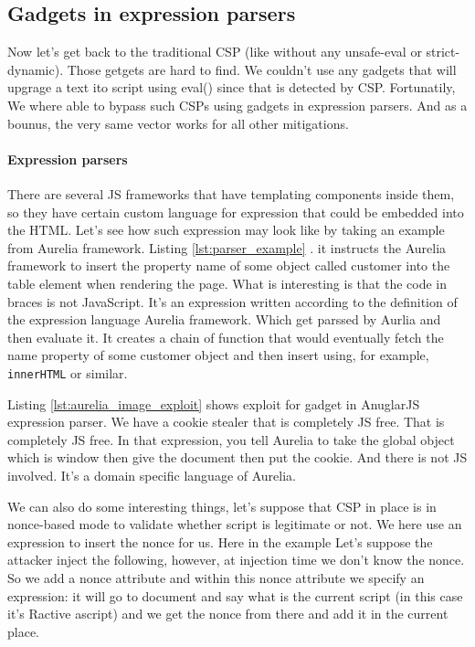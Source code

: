 \subsection{Gadgets in expression parsers}
Now let’s get back to the traditional CSP (like without any unsafe-eval or strict-dynamic). Those getgets are hard to find. We couldn’t use any gadgets that will upgrage a text ito script using eval() since that is detected by CSP. Fortunatily, We where able to bypass such CSPs using gadgets in expression parsers. And as a bounus, the very same vector works for all other mitigations. 

\paragraph{Expression parsers}
There are several JS frameworks that have templating components inside them, so they have certain custom language for expression that could be embedded into the HTML. Let’s see how such expression may look like by taking an example from Aurelia framework. Listing \ref{lst:parser_example} . it instructs the Aurelia framework to insert the property name of some object called customer into the table element when rendering the page. What is interesting is that the code in braces is not JavaScript. It’s an expression written according to the definition of the expression language Aurelia framework. Which get parssed by Aurlia and then evaluate it. It creates a chain of function that would eventually fetch the name property of some customer object and then insert using, for example, \verb|innerHTML| or similar. 



Listing \ref{lst:aurelia_image_exploit} shows exploit for gadget in AnuglarJS expression parser. We have a cookie stealer that is completely JS free. That is completely JS free. In that expression, you tell Aurelia to take the global object which is window then give the document then put the cookie. And there is not JS involved. It’s a domain specific language of Aurelia. 



We can also do some interesting things, let’s suppose that CSP in place is in nonce-based mode to validate whether script is legitimate or not. We here use an expression to insert the nonce for us. Here in the example Let’s suppose the attacker inject the following, however, at injection time we don’t know the nonce. So we add a nonce attribute and within this nonce attribute we specify an expression: it will go to document and say what is the current script (in this case it’s Ractive ascript) and we get the nonce from there and add it in the current place.   

